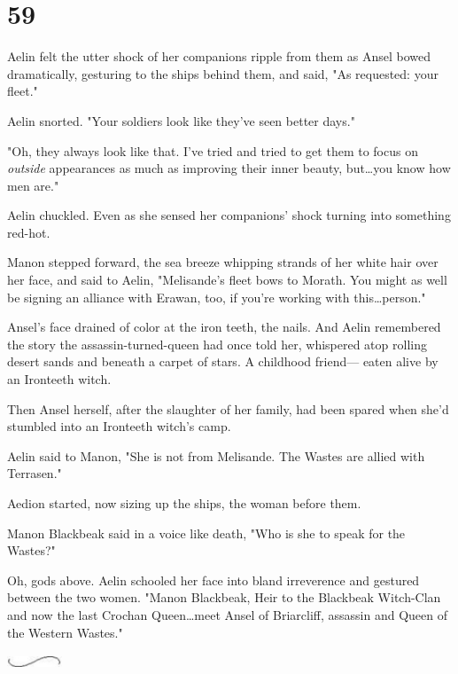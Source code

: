 
\chapter{59}

Aelin felt the utter shock of her companions ripple from them as Ansel bowed dramatically, gesturing to the ships behind them, and said, "As requested: your fleet."

Aelin snorted.
"Your soldiers look like they've seen better days."

"Oh, they always look like that.
I've tried and tried to get them to focus on \emph{outside} appearances as much as improving their inner beauty, but\ldots you know how men are."

Aelin chuckled.
Even as she sensed her companions' shock turning into something red-hot.

Manon stepped forward, the sea breeze whipping strands of her white hair over her face, and said to Aelin, "Melisande's fleet bows to Morath.
You might as well be signing an alliance with Erawan, too, if you're working with this\ldots person."

Ansel's face drained of color at the iron teeth, the nails.
And Aelin remembered the story the assassin-turned-queen had once told her, whispered atop rolling desert sands and beneath a carpet of stars.
A childhood friend--- eaten alive by an Ironteeth witch.

Then Ansel herself, after the slaughter of her family, had been spared when she'd stumbled into an Ironteeth witch's camp.

Aelin said to Manon, "She is not from Melisande.
The Wastes are allied with Terrasen."

Aedion started, now sizing up the ships, the woman before them.

Manon Blackbeak said in a voice like death, "Who is she to speak for the Wastes?"

Oh, gods above.
Aelin schooled her face into bland irreverence and gestured between the two women.
"Manon Blackbeak, Heir to the Blackbeak Witch-Clan and now the last Crochan Queen\ldots meet Ansel of Briarcliff, assassin and Queen of the Western Wastes."

\begin{center}
	\includegraphics[width=0.65in,height=0.13in]{images/seperator}
\end{center}

